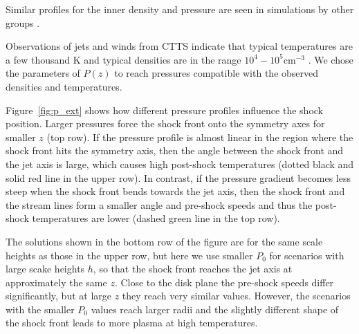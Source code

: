 Similar profiles for the inner density and pressure are seen in simulations by other groups \citep[e.g.]{2005ApJ...630..945A,Li_Krasnopolsky_Blandford_2006,2008ApJ...678.1109M}.

Observations of jets and winds from CTTS indicate that typical temperatures are a few thousand K and typical densities are in the range $10^4-10^5 \mathrm{ cm}^{-3}$ \citep[e.g.][]{2000A&A...356L..41L,2007ApJ...657..897K}. We chose the parameters of $P(z)$ to reach pressures compatible with the observed densities and temperatures.

Figure~\ref{fig:p_ext} shows how different pressure profiles influence the shock position. 
Larger pressures force the shock front onto the symmetry axes for smaller $z$ (top row). If the pressure profile is almost linear in the region where the shock front hits the symmetry axis, then the angle between the shock front and the jet axis is large, which causes high post-shock temperatures (dotted black and solid red line in the upper row). In contrast, if the pressure gradient becomes less steep when the shock front bends towards the jet axis, then the shock front and the stream lines form a smaller angle and pre-shock speeds and thus the post-shock temperatures are lower (dashed green line in the top row).

The solutions shown in the bottom row of the figure are for the same scale heights as those in the upper row, but here we use smaller $P_0$ for scenarios with large scake heights $h$, so that the shock front reaches the jet axis at approximately the same $z$. Close to the disk plane the pre-shock speeds differ significantly, but at large $z$ they reach very similar values. However, the scenarios with the smaller $P_0$ values reach larger radii and the slightly different shape of the shock front leads to more plasma at high temperatures.